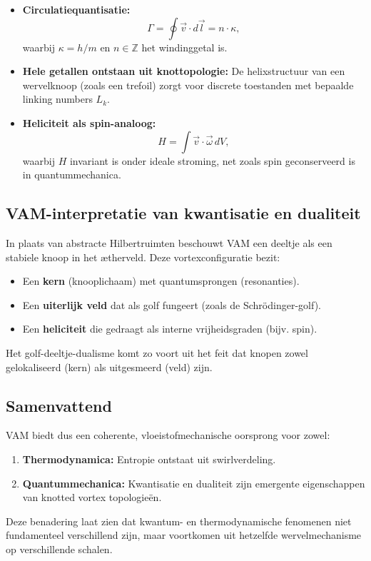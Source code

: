 \begin{itemize}
    \item \textbf{Circulatiequantisatie:}
    \begin{equation}
    \Gamma = \oint \vec{v} \cdot d\vec{l} = n \cdot \kappa,
    \end{equation}
    waarbij $\kappa = h/m$ en $n \in \mathbb{Z}$ het windinggetal is.

    \item \textbf{Hele getallen ontstaan uit knottopologie:} De helixstructuur van een wervelknoop (zoals een trefoil) zorgt voor discrete toestanden met bepaalde linking numbers $L_k$.

    \item \textbf{Heliciteit als spin-analoog:}
    \begin{equation}
    H = \int \vec{v} \cdot \vec{\omega} \, dV,
    \end{equation}
    waarbij $H$ invariant is onder ideale stroming, net zoals spin geconserveerd is in quantummechanica.
\end{itemize}

\subsection{VAM-interpretatie van kwantisatie en dualiteit}

In plaats van abstracte Hilbertruimten beschouwt VAM een deeltje als een stabiele knoop in het ætherveld. Deze vortexconfiguratie bezit:

\begin{itemize}
    \item Een \textbf{kern} (knooplichaam) met quantumsprongen (resonanties).
    \item Een \textbf{uiterlijk veld} dat als golf fungeert (zoals de Schrödinger-golf).
    \item Een \textbf{heliciteit} die gedraagt als interne vrijheidsgraden (bijv. spin).
\end{itemize}

Het golf-deeltje-dualisme komt zo voort uit het feit dat knopen zowel gelokaliseerd (kern) als uitgesmeerd (veld) zijn.

\subsection{Samenvattend}

VAM biedt dus een coherente, vloeistofmechanische oorsprong voor zowel:

\begin{enumerate}
    \item \textbf{Thermodynamica:} Entropie ontstaat uit swirlverdeling.
    \item \textbf{Quantummechanica:} Kwantisatie en dualiteit zijn emergente eigenschappen van knotted vortex topologieën.
\end{enumerate}

Deze benadering laat zien dat kwantum- en thermodynamische fenomenen niet fundamenteel verschillend zijn, maar voortkomen uit hetzelfde wervelmechanisme op verschillende schalen.

